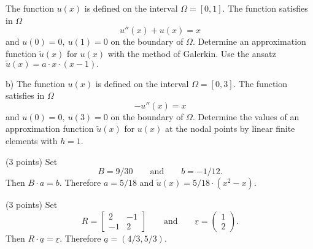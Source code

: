 \begin{teilaufgaben}
\item
The function $u(x)$ is defined on the interval $\Omega = [0, 1].$
The function satisfies in $\Omega$ 
\[
u''(x) + u(x) = x
\]
and $u(0) = 0, \  u(1) = 0$ on the boundary of $\Omega$.  
Determine an approximation function $\tilde u(x)$ for $u(x)$
with the method of Galerkin.
Use the ansatz $\tilde u(x) = a \cdot x \cdot (x-1).$
\item
b) The function $u(x)$ is defined on the interval $\Omega = [0, 3].$
The function satisfies in $\Omega$ 
\[
- u''(x) = x
\]
and $u(0) = 0, \  u(3) = 0$ on the boundary of $\Omega$.  
Determine the values of an approximation function $\tilde u(x)$ for
$u(x)$ at the nodal points by linear finite elements with $h = 1$.
\end{teilaufgaben}

\begin{loesung}
\begin{teilaufgaben}
\item
(3 points) Set
\[
B = 9/30
\qquad\text{and} \qquad
b = -1/12.
\]
Then $B \cdot {a} = {b}.$ Therefore $a = 5/18$ and
$\tilde u(x) = 5/18 \cdot (x^2 - x)$.
\item
(3 points) Set
\[
R
=
\left[\begin{array}{rr} 2 & -1  \\ -1 & 2  \end{array}\right]
\qquad\text{and}\qquad
\underline{r}
=
\left(\begin{array}{r} 1 \\ 2 \end{array}\right).
\]
Then $R \cdot \underline{a} = \underline{r}$.
Therefore $\underline{a} = (4/3,5/3)$.
\qedhere
\end{teilaufgaben}
\end{loesung}
